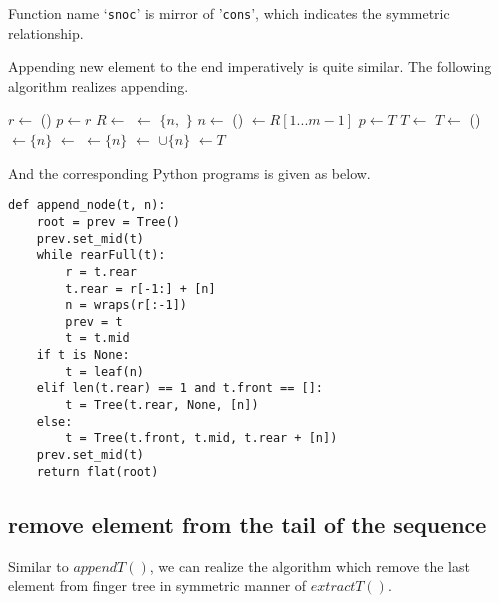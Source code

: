 \documentclass[UTF8]{article}
\begin{document}
Function name `\verb|snoc|' is mirror of '\verb|cons|', which indicates the symmetric relationship.

Appending new element to the end imperatively is quite similar. The following algorithm
realizes appending.

\begin{algorithmic}
  \State $r \gets $ ()
  \State $p \gets r$
  \State {}
    \State $R \gets $  
    \State {} $\gets$ $\{n, $  $\}$ 
    \State $n \gets$ ()
    \State {} $\gets R[1...m-1]$ 
    \State $p \gets T$
    \State $T \gets$ 
  \EndWhile
    \State $T \gets$ ()
    \State {} $\gets \{ n \}$
    \State {} $\gets$ 
    \State {} $\gets \{ n \}$
  \Else
    \State {} $\gets$  $\cup \{ n \} $
  \EndIf
  \State {} $\gets T$
  \State \Return {}
\EndFunction
\end{algorithmic}

And the corresponding Python programs is given as below.

\lstset{language=Python}
\begin{lstlisting}
def append_node(t, n):
    root = prev = Tree()
    prev.set_mid(t)
    while rearFull(t):
        r = t.rear
        t.rear = r[-1:] + [n]
        n = wraps(r[:-1])
        prev = t
        t = t.mid
    if t is None:
        t = leaf(n)
    elif len(t.rear) == 1 and t.front == []:
        t = Tree(t.rear, None, [n])
    else:
        t = Tree(t.front, t.mid, t.rear + [n])
    prev.set_mid(t)
    return flat(root)
\end{lstlisting}

\subsection{remove element from the tail of the sequence}

Similar to $appendT()$, we can realize the algorithm which remove the last element from
finger tree in symmetric manner of $extractT()$.
\end{document}
